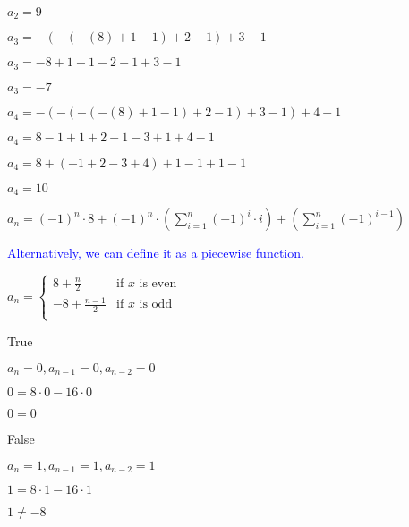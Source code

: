 \documentclass{exam}
\begin{document}
\begin{questions}
\begin{subparts}
\begin{center}
\(a_2 = 9\)
\vspace{5px}

\(a_3 = -(-(-(8) + 1 - 1) + 2 - 1) + 3 - 1 \)

\(a_3 = -8 + 1 - 1 - 2 + 1 + 3 - 1\)

\(a_3 = -7\)
\vspace{5px}

\(a_4 = -(-(-(-(8) + 1 - 1) + 2 - 1) + 3 - 1) + 4 - 1 \)

\(a_4 = 8 - 1 + 1 + 2 - 1 - 3 + 1 + 4 - 1 \)

\(a_4 = 8 + (-1 + 2 - 3 + 4) + 1 - 1 + 1 - 1 \)

\(a_4 = 10\)
\vspace{5px}

\(a_n = (-1)^n \cdot 8 + (-1)^n \cdot (\sum^n_{i=1} (-1)^i \cdot i) + (\sum^n_{i=1} (-1)^{i-1}) \)

\vspace{5px}
\textcolor{blue}{Alternatively, we can define it as a piecewise function.}

\(a_n = 
	\begin{cases}
        8+\frac{n}{2} & \text{if } x \text{ is even}\\
        -8+\frac{n-1}{2} & \text{if } x \text{ is odd}\\
    \end{cases}
\)

\end{center}

\end{subparts}

\begin{subparts}

\begin{center}
True

\( a_n = 0, a_{n-1} = 0, a_{n-2} = 0 \)

\( 0 = 8 \cdot 0 - 16 \cdot 0 \)

\( 0 = 0\)
\end{center}


\begin{center}
False

\( a_n = 1, a_{n-1} = 1, a_{n-2} = 1 \)

\( 1 = 8 \cdot 1 - 16 \cdot 1 \)

\( 1 \neq -8\)
\end{center}


\end{subparts}
\end{questions}
\end{document}

